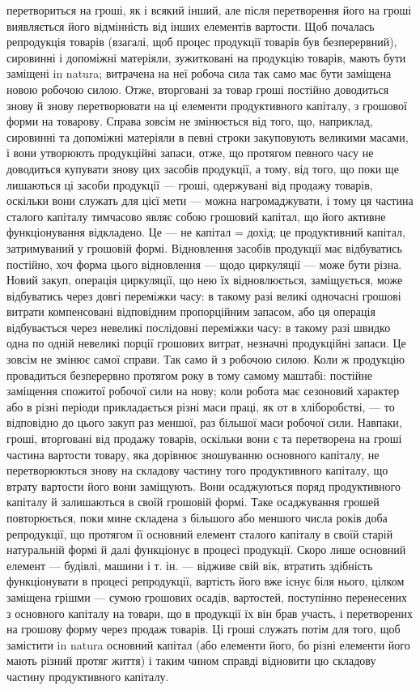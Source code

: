 перетвориться на гроші, як і всякий інший, але після перетворення його
на гроші виявляється його відмінність від інших елементів вартости.
Щоб почалась репродукція товарів (взагалі, щоб процес продукції
товарів був безперервний), сировинні і допоміжні матеріяли, зужитковані на
продукцію товарів, мають бути заміщені in natura; витрачена на неї робоча
сила так само має бути заміщена новою робочою силою. Отже, вторговані
за товар гроші постійно доводиться знову й знову перетворювати на ці елементи
продуктивного капіталу, з грошової форми на товарову. Справа зовсім
не змінюється від того, що, наприклад, сировинні та допоміжні матеріяли
в певні строки закуповують великими масами, і вони утворюють
продукційні запаси, отже, що протягом певного часу не доводиться купувати
знову цих засобів продукції, а тому, від того, що поки ще
лишаються ці засоби продукції — гроші, одержувані від продажу товарів,
оскільки вони служать для цієї мети — можна нагромаджувати, і тому
ця частина сталого капіталу тимчасово являє собою грошовий капітал,
що його активне функціонування відкладено. Це — не капітал = дохід; це
продуктивний капітал, затримуваний у грошовій формі. Відновлення засобів
продукції має відбуватись постійно, хоч форма цього відновлення
— щодо циркуляції — може бути різна. Новий закуп, операція циркуляції,
що нею їх відновлюється, заміщується, може відбуватись через довгі переміжки
часу: в такому разі великі одночасні грошові витрати компенсовані
відповідним пропорційним запасом, або ця операція відбувається через невеликі
послідовні переміжки часу: в такому разі швидко одна по одній невеликі
порції грошових витрат, незначні продукційні запаси. Це зовсім не
змінює самої справи. Так само й з робочою силою. Коли ж продукцію
провадиться безперервно протягом року в тому самому маштабі: постійне
заміщення спожитої робочої сили на нову; коли робота має сезоновий характер
або в різні періоди прикладається різні маси праці, як от в хліборобстві,
— то відповідно до цього закуп раз меншої, раз більшої маси робочої
сили. Навпаки, гроші, вторговані від продажу товарів, оскільки вони
є та перетворена на гроші частина вартости товару, яка дорівнює зношуванню
основного капіталу, не перетворюються знову на складову частину
того продуктивного капіталу, що втрату вартости його вони заміщують.
Вони осаджуються поряд продуктивного капіталу й залишаються в своїй
грошовій формі. Таке осаджування грошей повторюється, поки мине
складена з більшого або меншого числа років доба репродукції, що
протягом її основний елемент сталого капіталу в своїй старій натуральній
формі й далі функціонує в процесі продукції. Скоро лише основний
елемент — будівлі, машини і т. ін. — відживе свій вік, втратить здібність
функціонувати в процесі репродукції, вартість його вже існує біля нього,
цілком заміщена грішми — сумою грошових осадів, вартостей, поступінно
перенесених з основного капіталу на товари, що в продукції їх він брав
участь, і перетворених на грошову форму через продаж товарів. Ці гроші
служать потім для того, щоб замістити in natura основний капітал (або
елементи його, бо різні елементи його мають різний протяг життя) і таким
чином справді відновити цю складову частину продуктивного капіталу.
